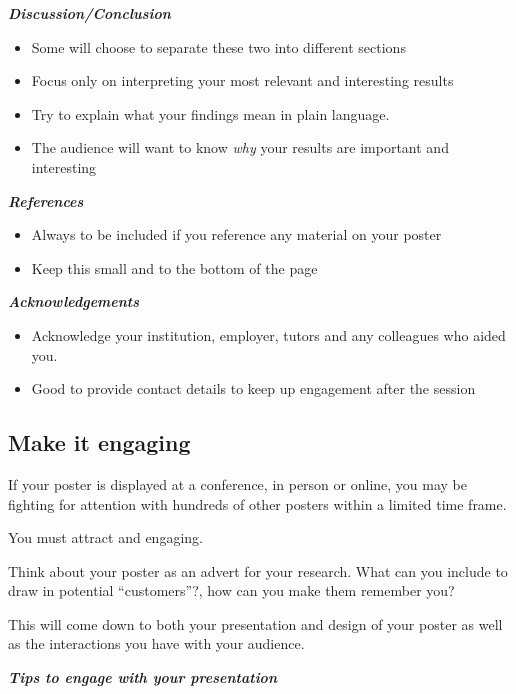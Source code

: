 \documentclass[
]{book}
\providecommand{\tightlist}{%
  \setlength{\itemsep}{0pt}\setlength{\parskip}{0pt}}
\begin{document}
\textbf{\emph{Discussion/Conclusion}}

\begin{itemize}
\tightlist
\item
  Some will choose to separate these two into different sections
\item
  Focus only on interpreting your most relevant and interesting results
\item
  Try to explain what your findings mean in plain language.
\item
  The audience will want to know \emph{why} your results are important and interesting
\end{itemize}

\textbf{\emph{References}}

\begin{itemize}
\tightlist
\item
  Always to be included if you reference any material on your poster
\item
  Keep this small and to the bottom of the page
\end{itemize}

\textbf{\emph{Acknowledgements}}

\begin{itemize}
\tightlist
\item
  Acknowledge your institution, employer, tutors and any colleagues who aided you.
\item
  Good to provide contact details to keep up engagement after the session
\end{itemize}

\hypertarget{make-it-engaging}{%
\subsection{Make it engaging}\label{make-it-engaging}}

If your poster is displayed at a conference, in person or online, you may be fighting for attention with hundreds of other posters within a limited time frame.

You must attract and engaging.

Think about your poster as an advert for your research. What can you include to draw in potential ``customers''?, how can you make them remember you?

This will come down to both your presentation and design of your poster as well as the interactions you have with your audience.

\textbf{\emph{Tips to engage with your presentation}}
\end{document}
